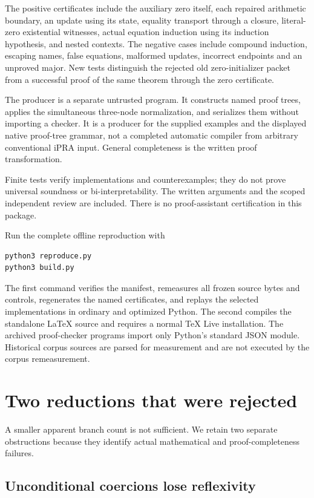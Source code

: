 \documentclass[11pt,letterpaper]{article}
\theoremstyle{definition}\newtheorem{definition}[theorem]{Definition}
\theoremstyle{remark}\newtheorem{remark}[theorem]{Remark}
\begin{document}


The positive certificates include the auxiliary zero itself, each
repaired arithmetic boundary, an update using its state, equality
transport through a closure, literal-zero existential witnesses, actual
equation induction using its induction hypothesis, and nested contexts.
The negative cases include compound induction, escaping names, false
equations, malformed updates, incorrect endpoints and an unproved major.
New tests distinguish the rejected old zero-initializer packet from a
successful proof of the same theorem through the zero certificate.

The producer is a separate untrusted program. It constructs named proof
trees, applies the simultaneous three-node normalization, and serializes
them without importing a checker. It is a producer for the supplied
examples and the displayed native proof-tree grammar, not a completed
automatic compiler from arbitrary conventional iPRA input. General
completeness is the written proof transformation.

Finite tests verify implementations and counterexamples; they do not
prove universal soundness or bi-interpretability. The written arguments
and the scoped independent review are included. There is no proof-assistant
certification in this package.

Run the complete offline reproduction with
\begin{lstlisting}
python3 reproduce.py
python3 build.py
\end{lstlisting}
The first command verifies the manifest, remeasures all frozen source
bytes and controls, regenerates the named certificates, and replays the
selected implementations in ordinary and optimized Python. The second
compiles the standalone LaTeX source and requires a normal TeX Live
installation. The archived proof-checker programs import only Python's
standard JSON module. Historical corpus sources are parsed for
measurement and are not executed by the corpus remeasurement.

\section{Two reductions that were rejected}
\label{sec:failed}

A smaller apparent branch count is not sufficient. We retain two
separate obstructions because they identify actual mathematical and
proof-completeness failures.

\subsection{Unconditional coercions lose reflexivity}
\end{document}
